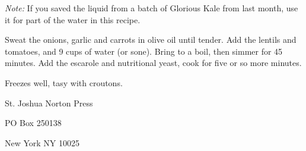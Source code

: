 \documentclass[12pt]{article}
\begin{document}
{\em Note:} If you saved the liquid from a batch of Glorious Kale from
last month, use it for part of the water in this recipe.

Sweat the onions, garlic and carrots in olive oil until tender. Add the
lentils and tomatoes, and 9 cups of water (or sone). Bring to a boil,
then simmer for 45 minutes. Add the escarole and nutritional yeast, cook
for five or so more minutes.

Freezes well, tasy with croutons.

\newpage

\thispagestyle{empty}
\vspace*{12cm}
\begin{sideways}
\Large{St. Joshua Norton Press}
\end{sideways}
\begin{sideways}
\Large{PO Box 250138}
\end{sideways}
\begin{sideways}
\Large{New York NY 10025}
\end{sideways}
\end{document}
